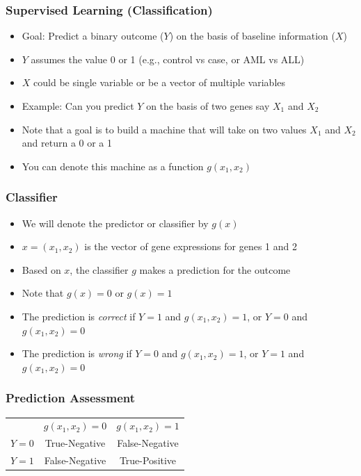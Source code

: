 \documentclass[xcolor=x11names,compress]{beamer}\usepackage[]{graphicx}\usepackage[]{color}
\begin{document}
\begin{frame}
  \frametitle{Supervised Learning (Classification)}
  \begin{itemize}
\item Goal: Predict a binary outcome ($Y$) on the basis of 
      baseline information ($X$)
\item $Y$ assumes the value 0 or 1 (e.g., control vs case, or AML vs ALL)
\item $X$ could be single variable or be a vector of multiple variables
\item Example: Can you predict $Y$ on the basis of two genes say $X_1$ and $X_2$
\item Note that a goal is to build a machine that will take on two values $X_1$ and $X_2$
      and return a 0 or a 1
\item You can denote this machine as a function $g(x_1,x_2)$
\end{itemize}
\end{frame}

\begin{frame}
  \frametitle{Classifier}
  \begin{itemize}
\item We will denote the predictor or classifier by $g(x)$
\item $x=(x_1,x_2)$ is the vector of gene expressions for genes 1 and 2
\item Based on $x$, the classifier $g$ makes a prediction for the outcome
\item Note that $g(x)=0$ or $g(x)=1$
\item The prediction is {\it correct} if $Y=1$ and $g(x_1,x_2)=1$, or $Y=0$ and $g(x_1,x_2)=0$
\item The prediction is {\it wrong} if $Y=0$ and $g(x_1,x_2)=1$, or $Y=1$ and $g(x_1,x_2)=0$
\end{itemize}
\end{frame}


\begin{frame}
  \frametitle{Prediction Assessment}
\begin{table}
\centering
  \begin{tabular}{ccc}
       &$g(x_1,x_2)=0$&$g(x_1,x_2)=1$\\
  $Y=0$&True-Negative&False-Negative\\
  $Y=1$&False-Negative&True-Positive
  \end{tabular}
\end{table}
\end{frame}
\end{document}
